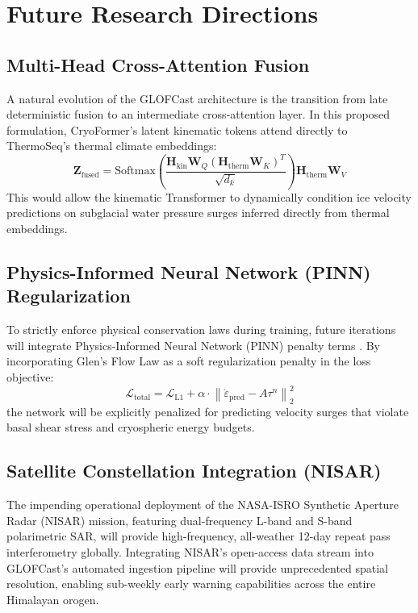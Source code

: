 \documentclass{mnnit}
\begin{document}
\section{Future Research Directions}

\subsection{Multi-Head Cross-Attention Fusion}
A natural evolution of the GLOFCast architecture is the transition from late deterministic fusion to an intermediate cross-attention layer. In this proposed formulation, CryoFormer's latent kinematic tokens attend directly to ThermoSeq's thermal climate embeddings:
\begin{equation}
    \mathbf{Z}_{\text{fused}} = \text{Softmax}\left(\frac{\mathbf{H}_{\text{kin}} \mathbf{W}_Q (\mathbf{H}_{\text{therm}} \mathbf{W}_K)^T}{\sqrt{d_k}}\right) \mathbf{H}_{\text{therm}} \mathbf{W}_V
\end{equation}
This would allow the kinematic Transformer to dynamically condition ice velocity predictions on subglacial water pressure surges inferred directly from thermal embeddings.

\subsection{Physics-Informed Neural Network (PINN) Regularization}
To strictly enforce physical conservation laws during training, future iterations will integrate Physics-Informed Neural Network (PINN) penalty terms \cite{raissi2019physics}. By incorporating Glen's Flow Law as a soft regularization penalty in the loss objective:
\begin{equation}
    \mathcal{L}_{\text{total}} = \mathcal{L}_{\text{L1}} + \alpha \cdot \left\| \dot{\varepsilon}_{\text{pred}} - A \tau^n \right\|_2^2
\end{equation}
the network will be explicitly penalized for predicting velocity surges that violate basal shear stress and cryospheric energy budgets.

\subsection{Satellite Constellation Integration (NISAR)}
The impending operational deployment of the NASA-ISRO Synthetic Aperture Radar (NISAR) mission, featuring dual-frequency L-band and S-band polarimetric SAR, will provide high-frequency, all-weather 12-day repeat pass interferometry globally. Integrating NISAR's open-access data stream into GLOFCast's automated ingestion pipeline will provide unprecedented spatial resolution, enabling sub-weekly early warning capabilities across the entire Himalayan orogen.



\end{document}
